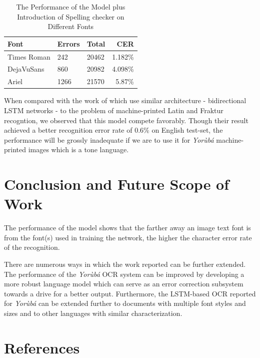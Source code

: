 \documentclass[review]{elsarticle}
\newcommand{\yor}{\textit{Yor\`ub\'a }}
\begin{document}
 

\begin{table}
\centering
{\caption{The Performance of the Model plus Introduction of Spelling checker on Different Fonts}\label{utterance structure} \smallskip}
\begin{tabular}{l p{3.0cm} p{3.0cm} r}\toprule[0.01cm]
	Font & Errors & Total&CER \bigstrut \\[2ex] \toprule[0.01cm]
	Times Roman & 242  & 20462 & 1.182\%  \bigstrut \\[2ex]
	DejaVuSans  & 860 & 20982 & 4.098\% \bigstrut \\[2ex]
	Ariel       & 1266 & 21570 & 5.87\% \bigstrut \\[2ex]
	\hline
\end{tabular}
\end{table}

When compared with the work of \cite{breuel2013high} which use similar architecture - bidirectional LSTM networks - to the problem of machine-printed Latin and Fraktur recogntion, we observed that this model compete favorably.  Though their result achieved a better recognition error rate of 0.6\% on English test-set, the performance will be grossly inadequate if we are to use it for \yor machine-printed images which is a tone language. 

\section{Conclusion and Future Scope of Work}
The performance of the model shows that the farther away an image text font is from the font(s) used in training the network, the higher the character error rate of the recognition. 

There are numerous ways in which the work reported can be further extended. The performance of the \yor OCR system can be improved by developing a more robust language model which can serve as an error correction subsystem towards a drive for a better output. Furthermore, the LSTM-based OCR reported for \yor can be extended further to documents with multiple font styles and sizes and to other languages with similar characterization.
\clearpage



\section*{References}


\end{document}
